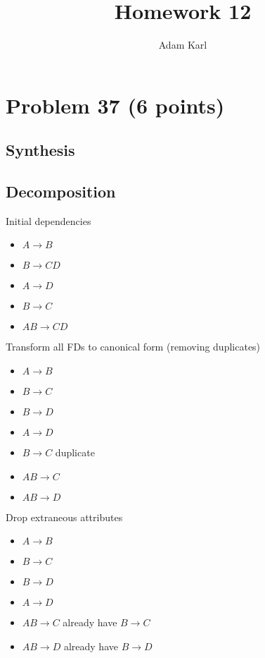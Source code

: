 \documentclass[a4paper]{article}
\title{Homework 12}
\author{Adam Karl}
\begin{document}
\maketitle

\section{Problem 37 (6 points)}
\subsection{Synthesis}

\subsection{Decomposition}
Initial dependencies

\begin{itemize}
    \item $A \rightarrow B$
    \item $B \rightarrow CD$
    \item $A \rightarrow D$
    \item $B \rightarrow C$
    \item $AB \rightarrow CD$
\end{itemize}

Transform all FDs to canonical form (removing duplicates)

\begin{itemize}
    \item $A \rightarrow B$
    \item $B \rightarrow C$
    \item $B \rightarrow D$
    \item $A \rightarrow D$
    \item \sout{$B \rightarrow C$} duplicate
    \item $AB \rightarrow C$
    \item $AB \rightarrow D$
\end{itemize}

Drop extraneous attributes

\begin{itemize}
    \item $A \rightarrow B$
    \item $B \rightarrow C$
    \item $B \rightarrow D$
    \item $A \rightarrow D$
    \item \sout{$AB \rightarrow C$} already have $B \rightarrow C$
    \item \sout{$AB \rightarrow D$} already have $B \rightarrow D$
\end{itemize}
\end{document}
